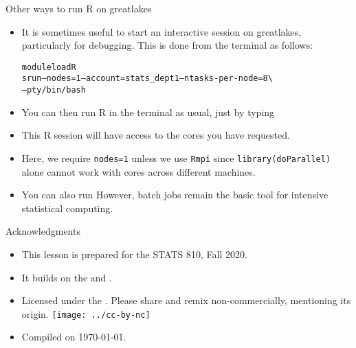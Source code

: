 \begin{frame}[fragile]{Other ways to run R on greatlakes}

\begin{itemize}
\item It is sometimes useful to start an interactive session on greatlakes, particularly for debugging. This is done from the terminal as follows: 
\begin{knitrout}\small
{}\color{fgcolor}\begin{kframe}
\begin{alltt}
module load R
srun --nodes=1 --account=stats_dept1 --ntasks-per-node=8 \textbackslash{}
  --pty /bin/bash
\end{alltt}
\end{kframe}
\end{knitrout}
\item You can then run R in the terminal as usual, just by typing
\begin{knitrout}\small
{}\color{fgcolor}\begin{kframe}
\begin{alltt}
\end{alltt}
\end{kframe}
\end{knitrout}
\item This R session will have access to the cores you have requested.
\item Here, we require \texttt{nodes=1} unless we use \texttt{Rmpi} since \texttt{library(doParallel)} alone cannot work with cores across different machines.
\item You can also run 
However, batch jobs remain the basic tool for intensive statistical computing.
\end{itemize}

\end{frame}


\begin{frame}{Acknowledgments}
  \begin{itemize}
  \item
    This lesson is prepared for the STATS 810, Fall 2020.
  \item
    It builds on the  and .
\item
    Licensed under the .
    Please share and remix non-commercially, mentioning its origin.
    \texttt{[image: ../cc-by-nc]}
  \item
    Compiled on \today.

  \end{itemize}

\end{frame}



